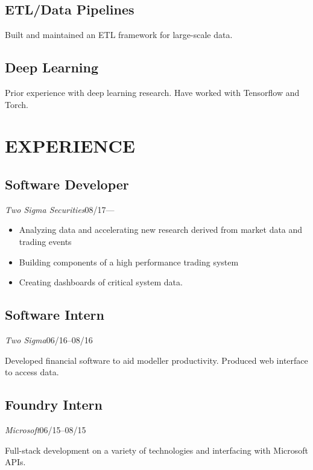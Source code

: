 \documentclass[11pt]{article}
\begin{document}
\begin{minipage}[t]{0.40\textwidth}
  \medskip
  \subsection*{ETL/Data Pipelines}
  Built and maintained an ETL framework for large-scale data.

  \medskip
  \subsection*{Deep Learning}
  Prior experience with deep learning research.
  Have worked with Tensorflow and Torch.


\end{minipage}\hspace{0.04\textwidth}
\begin{minipage}[t]{0.55\textwidth}
  \section*{\LARGE EXPERIENCE}

  \subsection*{Software Developer}
  \emph{Two Sigma Securities}\hfill08/17---
  \smallskip

  \begin{itemize}
  \item Analyzing data and accelerating new research derived from market data and trading events
  \item Building components of a high performance trading system
  \item Creating dashboards of critical system data.
  \end{itemize}

  \medskip
  \subsection*{Software Intern}
  \emph{Two Sigma}\hfill 06/16--08/16
  \smallskip

  Developed financial software to aid modeller productivity.
  Produced web interface to access data.

  \medskip
  \subsection*{Foundry Intern}
  \emph{Microsoft}\hfill 06/15--08/15
  \smallskip

  Full-stack development on a variety of technologies and interfacing with Microsoft APIs.


\end{minipage}
\end{document}
